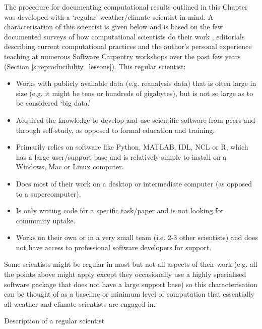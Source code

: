 \begin{featurebox}

\begin{tcolorbox}[width=\textwidth]

The procedure for documenting computational results outlined in this Chapter was developed with a `regular' weather/climate scientist in mind. A characterisation of this scientist is given below and is based on the few documented surveys of how computational scientists do their work \citep{Hannay2009,Stodden2010,Momcheva2015}, editorials describing current computational practices \citep[e.g.][]{Easterbrook2014} and the author's personal experience teaching at numerous Software Carpentry workshops over the past few years (Section \ref{s:reproducibility_lessons}). This regular scientist:
\begin{itemize}
\item Works with publicly available data (e.g. reanalysis data) that is often large in size (e.g. it might be tens or hundreds of gigabytes), but is not so large as to be considered `big data.' 
\item Acquired the knowledge to develop and use scientific software from peers and through self-study, as opposed to formal education and training.
\item Primarily relies on software like Python, MATLAB, IDL, NCL or R, which has a large user/support base and is relatively simple to install on a Windows, Mac or Linux computer.
\item Does most of their work on a desktop or intermediate computer (as opposed to a supercomputer).
\item Is only writing code for a specific task/paper and is not looking for community uptake.  
\item Works on their own or in a very small team (i.e. 2-3 other scientists) and does not have access to professional software developers for support.
\end{itemize}

Some scientists might be regular in most but not all aspects of their work (e.g. all the points above might apply except they occasionally use a highly specialised software package that does not have a large support base) so this characterisation can be thought of as a baseline or minimum level of computation that essentially all weather and climate scientists are engaged in.  

\end{tcolorbox}

\caption{\label{box:regular_scientist}
Description of a regular scientist}
\end{featurebox}


